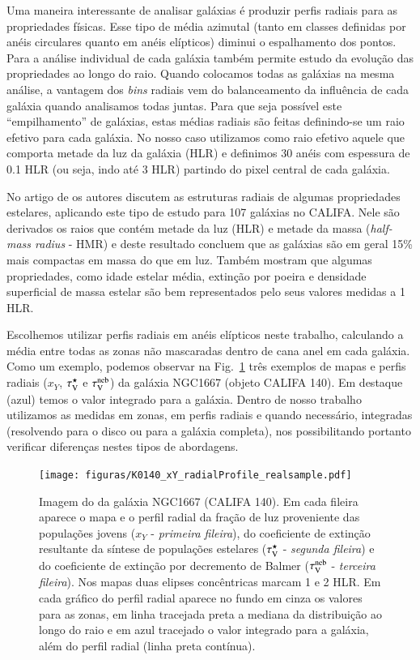 Uma maneira interessante de analisar galáxias é produzir perfis radiais para as propriedades
físicas. Esse tipo de média azimutal (tanto em classes definidas por anéis circulares quanto em
anéis elípticos) diminui o espalhamento dos pontos. Para a análise individual de cada galáxia também
permite estudo da evolução das propriedades ao longo do raio. Quando colocamos todas as galáxias na
mesma análise, a vantagem dos {\em bins} radiais vem do balanceamento da influência de cada galáxia
quando analisamos todas juntas. Para que seja possível este ``empilhamento'' de galáxias, estas
médias radiais são feitas definindo-se um raio efetivo para cada galáxia. No nosso caso utilizamos
como raio efetivo aquele que comporta metade da luz da galáxia (HLR) e definimos 30 anéis com
espessura de 0.1 HLR (ou seja, indo até 3 HLR) partindo do pixel central de cada galáxia.

No artigo de \citet{GonzalezDelgado.etal.2014a} os autores discutem as estruturas radiais de algumas
propriedades estelares, aplicando este tipo de estudo para 107 galáxias no CALIFA. Nele são
derivados os raios que contém metade da luz (HLR) e metade da massa ({\em half-mass radius} - HMR) e
deste resultado concluem que as galáxias são em geral 15\% mais compactas em massa do que em luz.
Também mostram que algumas propriedades, como idade estelar média, extinção por poeira e densidade
superficial de massa estelar são bem representados pelo seus valores medidas a 1 HLR.

Escolhemos utilizar perfis radiais em anéis elípticos neste trabalho, calculando a média entre todas
as zonas não mascaradas dentro de cana anel em cada galáxia. Como um exemplo, podemos observar na
Fig.\ \ref{fig:K0140xYRadProf} três exemplos de mapas e perfis radiais ($x_Y$, $\tau_{\mathrm{V}}^\star$ e $\tau_{\mathrm{V}}^{\mathrm{neb}}$)
da galáxia NGC1667 (objeto CALIFA 140). Em destaque (azul) temos o valor integrado para a galáxia.
Dentro de nosso trabalho utilizamos as medidas em zonas, em perfis radiais e quando necessário,
integradas (resolvendo para o disco ou para a galáxia completa), nos possibilitando portanto
verificar diferenças nestes tipos de abordagens.

\begin{figure}
	\centering
	\texttt{[image: figuras/K0140\_xY\_radialProfile\_realsample.pdf]}
	\caption[Imagem e exemplos de mapas e perfis radiais]
	{Imagem do \SDSS da galáxia NGC1667 (CALIFA 140). Em cada fileira aparece o mapa e o perfil radial
da fração de luz proveniente das populações jovens ($x_Y$ - \emph{primeira fileira}), do
coeficiente de extinção resultante da síntese de populações estelares ($\tau_{\mathrm{V}}^\star$ - \emph{segunda
fileira}) e do coeficiente de extinção por decremento de Balmer ($\tau_{\mathrm{V}}^{\mathrm{neb}}$ - \emph{terceira
fileira}). Nos mapas duas elipses concêntricas marcam 1 e 2 HLR. Em cada gráfico do perfil radial
aparece no fundo em cinza os valores para as zonas, em linha tracejada preta a mediana da
distribuição ao longo do raio e em azul tracejado o valor integrado para a galáxia, além do perfil
radial (linha preta contínua).}
	\label{fig:K0140xYRadProf}
\end{figure}

